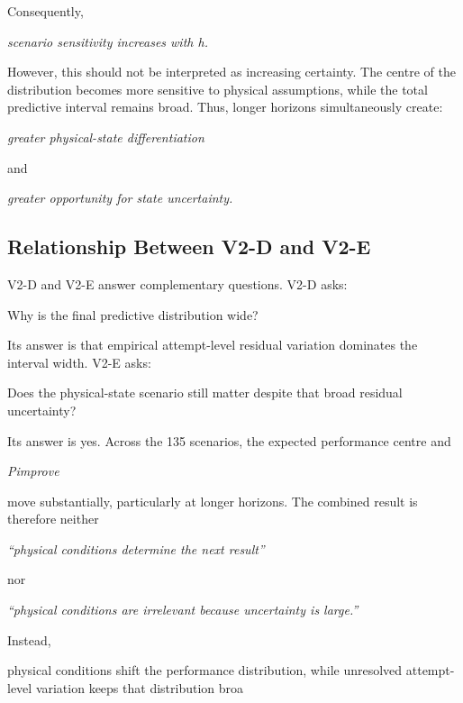 Consequently,

\begin{center}\textit{scenario sensitivity increases with h.}\end{center}

However, this should not be interpreted as increasing certainty. The centre of the distribution becomes more sensitive to physical assumptions, while the total predictive interval remains broad. Thus, longer horizons simultaneously create:

\begin{center}\textit{greater physical-state differentiation}\end{center}

and

\begin{center}\textit{greater opportunity for state uncertainty.}\end{center}

\subsection{Relationship Between V2-D and V2-E}
V2-D and V2-E answer complementary questions. V2-D asks:

Why is the final predictive distribution wide?

Its answer is that empirical attempt-level residual variation dominates the interval width. V2-E asks:

Does the physical-state scenario still matter despite that broad residual uncertainty?

Its answer is yes. Across the 135 scenarios, the expected performance centre and

\begin{center}\textit{Pimprove}\end{center}

move substantially, particularly at longer horizons. The combined result is therefore neither

\begin{center}\textit{``physical conditions determine the next result''}\end{center}

nor

\begin{center}\textit{``physical conditions are irrelevant because uncertainty is large.''}\end{center}

Instead,

physical conditions shift the performance distribution, while unresolved attempt-level variation keeps that distribution broa

